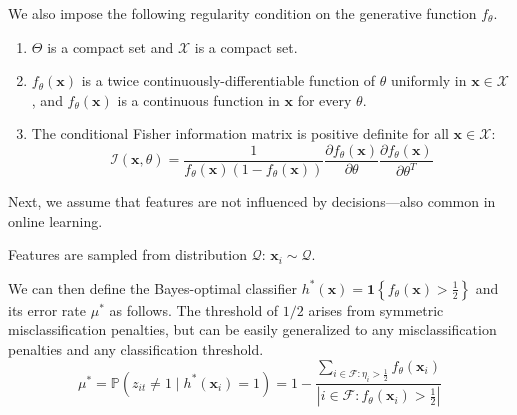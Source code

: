 \documentclass[nonblindrev]{informs3noheader}
\def\P{\mathbb{P}}
\def\calF{\mathcal{F}}
\def\calQ{\mathcal{Q}}
\def\calX{\mathcal{X}}
\def\bx{\boldsymbol{x}}
\begin{document}
We also impose the following regularity condition on the generative function $f_\theta$.
\begin{stat}[Regularity]\label{ass:regularity}
\begin{enumerate}
    \item $\Theta$ is a compact set and $\mathcal{X}$ is a compact set.
    \item $f_\theta(\bx)$ is a twice continuously-differentiable function of $\theta$ uniformly in $\bx \in \mathcal{X}$, and $f_\theta(\bx)$ is a continuous function in $\bx$ for every $\theta$. 
    \item The conditional Fisher information matrix is positive definite for all $\bx\in\calX$:
    \[\mathcal{I}(\bx,\theta) = \frac{1}{f_\theta(\bx)(1-f_\theta(\bx))}\frac{\partial f_\theta(\bx)}{\partial \theta}\frac{\partial f_\theta(\bx)}{\partial \theta^T} \]
\end{enumerate}
\end{stat}

Next, we assume that features are not influenced by decisions---also common in online learning.

\begin{stat}[Features]\label{ass:features}
    Features are sampled from distribution $\calQ$:
    $\bx_{i}\sim \calQ$.
\end{stat}

We can then define the Bayes-optimal classifier $h^*(\bx)=\mathbf{1}\left\{f_\theta(\bx)>\frac{1}{2}\right\}$ and its error rate $\mu^*$ as follows.  The threshold of $1/2$ arises from symmetric misclassification penalties, but can be easily generalized to any misclassification penalties and any classification threshold.
$$\mu^*=\P(z_{it}\neq1 \mid h^*(\bx_i)=1)=1-\frac{\sum_{i\in\calF:\eta_{i}>\frac{1}{2}}f_\theta(\bx_{i})}{\left|i\in\calF:f_\theta(\bx_{i})>\frac{1}{2}\right|}$$
\end{document}
